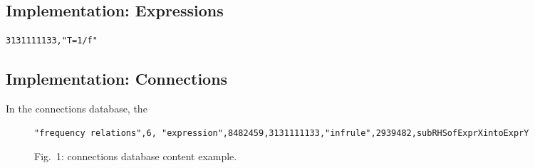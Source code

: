\documentclass{article}
\begin{document}
\begin{multicols}{2}
\subsection{Implementation: Expressions\label{sec:expressions}}

\begin{verbatim}
3131111133,"T=1/f"
\end{verbatim}

\subsection{Implementation: Connections\label{sec:connections}}

In the connections database, the 
\end{multicols}
\begin{figure}
\begin{verbatim}
"frequency relations",6, "expression",8482459,3131111133,"infrule",2939482,subRHSofExprXintoExprY
\end{verbatim}
\caption{Fig.~1: connections database content example.}
\end{figure}
\end{document}
